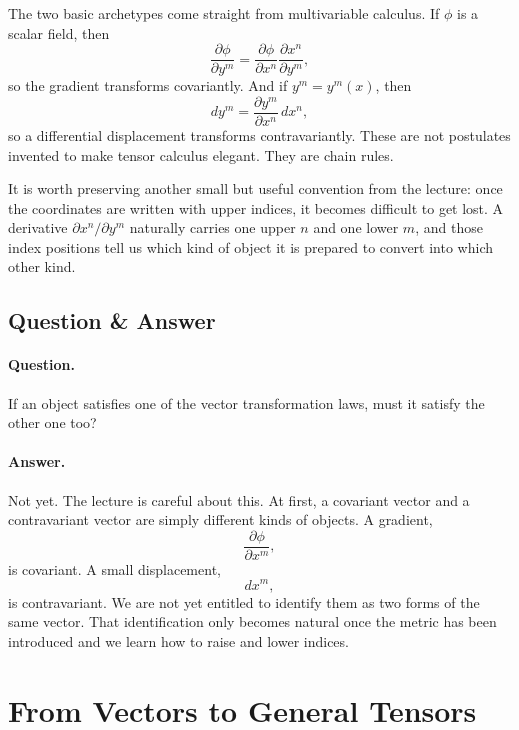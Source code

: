 The two basic archetypes come straight from multivariable calculus. If \(\phi\) is a scalar field, then
\begin{equation}
\frac{\partial \phi}{\partial y^m}
=
\frac{\partial \phi}{\partial x^n}
\frac{\partial x^n}{\partial y^m},
\end{equation}
so the gradient transforms covariantly. And if \(y^m=y^m(x)\), then
\begin{equation}
dy^m=\frac{\partial y^m}{\partial x^n}\,dx^n,
\end{equation}
so a differential displacement transforms contravariantly. These are not postulates invented to make tensor calculus elegant. They are chain rules.

It is worth preserving another small but useful convention from the lecture: once the coordinates are written with upper indices, it becomes difficult to get lost. A derivative \(\partial x^n/\partial y^m\) naturally carries one upper \(n\) and one lower \(m\), and those index positions tell us which kind of object it is prepared to convert into which other kind.

\subsection{Question \& Answer}

\paragraph{Question.} If an object satisfies one of the vector transformation laws, must it satisfy the other one too?

\paragraph{Answer.} Not yet. The lecture is careful about this. At first, a covariant vector and a contravariant vector are simply different kinds of objects. A gradient,
\[
\frac{\partial \phi}{\partial x^m},
\]
is covariant. A small displacement,
\[
dx^m,
\]
is contravariant. We are not yet entitled to identify them as two forms of the same vector. That identification only becomes natural once the metric has been introduced and we learn how to raise and lower indices.

\section{From Vectors to General Tensors}

